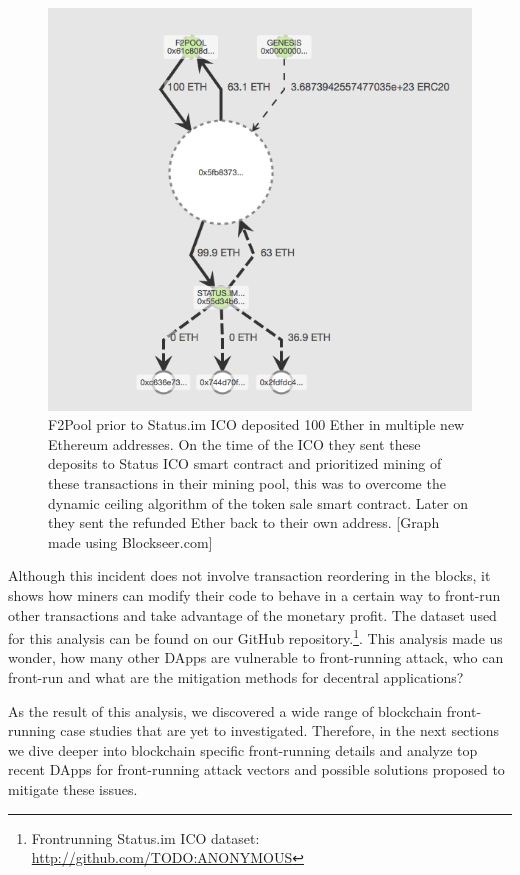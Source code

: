 \begin{figure}[h]
\centering
\includegraphics[width=0.7\linewidth]{figures/F2Pool_transactions_to_StatusICO_and_Refunds.png}
\caption{F2Pool prior to Status.im ICO deposited 100 Ether in multiple new Ethereum addresses. On the time of the ICO they sent these deposits to Status ICO smart contract and prioritized mining of these transactions in their mining pool, this was to overcome the dynamic ceiling algorithm of the token sale smart contract. Later on they sent the refunded Ether back to their own address. [Graph made using Blockseer.com] \label{fig:f2poolfront-run}}
\end{figure}


Although this incident does not involve transaction reordering in the blocks, it shows how miners can modify their code to behave in a certain way to front-run other transactions and take advantage of the monetary profit. The dataset used for this analysis can be found on our GitHub repository.\footnote{Frontrunning Status.im ICO dataset: \url{http://github.com/TODO:ANONYMOUS}}. This analysis made us wonder, how many other DApps are vulnerable to front-running attack, who can front-run and what are the mitigation methods for decentral applications?

As the result of this analysis, we discovered a wide range of blockchain front-running case studies that are yet to investigated. Therefore, in the next sections we dive deeper into blockchain specific front-running details and analyze top recent DApps for front-running attack vectors and possible solutions proposed to mitigate these issues.


